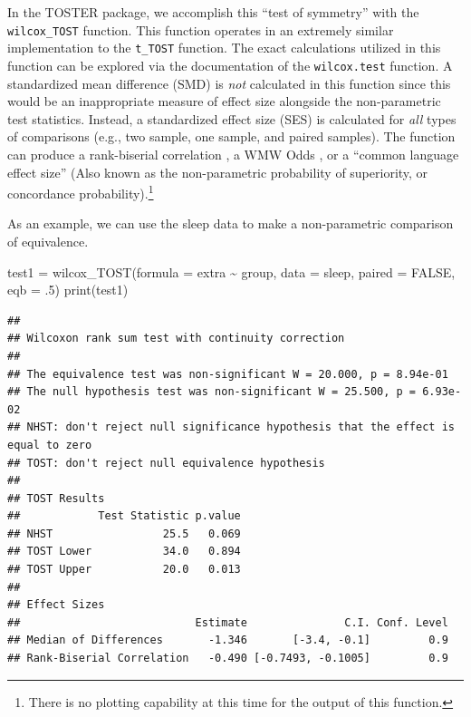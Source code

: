 \documentclass[]{interact}
\theoremstyle{plain}%
\theoremstyle{definition}
\theoremstyle{remark}
\newenvironment{Shaded}{\begin{snugshade}}{\end{snugshade}}
\newcommand{\AttributeTok}[1]{\textcolor[rgb]{0.77,0.63,0.00}{#1}}
\newcommand{\ConstantTok}[1]{\textcolor[rgb]{0.00,0.00,0.00}{#1}}
\newcommand{\DecValTok}[1]{\textcolor[rgb]{0.00,0.00,0.81}{#1}}
\newcommand{\FunctionTok}[1]{\textcolor[rgb]{0.00,0.00,0.00}{#1}}
\newcommand{\NormalTok}[1]{#1}
\newcommand{\OtherTok}[1]{\textcolor[rgb]{0.56,0.35,0.01}{#1}}
\newcommand{\SpecialCharTok}[1]{\textcolor[rgb]{0.00,0.00,0.00}{#1}}
\begin{document}
In the TOSTER package, we accomplish this ``test of symmetry'' with the
\texttt{wilcox\_TOST} function. This function operates in an extremely
similar implementation to the \texttt{t\_TOST} function. The exact
calculations utilized in this function can be explored via the
documentation of the \texttt{wilcox.test} function. A standardized mean
difference (SMD) is \emph{not} calculated in this function since this
would be an inappropriate measure of effect size alongside the
non-parametric test statistics. Instead, a standardized effect size
(SES) is calculated for \emph{all} types of comparisons (e.g., two
sample, one sample, and paired samples). The function can produce a
rank-biserial correlation \citep{Kerby_2014}, a WMW Odds
\citep{wmwodds}, or a ``common language effect size'' \citep{Kerby_2014}
(Also known as the non-parametric probability of superiority, or
concordance probability).\footnote{There is no plotting capability at
  this time for the output of this function.}

\newpage

As an example, we can use the sleep data to make a non-parametric
comparison of equivalence.

\begin{Shaded}
\begin{Highlighting}[]
\NormalTok{test1 }\OtherTok{=} \FunctionTok{wilcox\_TOST}\NormalTok{(}\AttributeTok{formula =}\NormalTok{ extra }\SpecialCharTok{\textasciitilde{}}\NormalTok{ group,}
                      \AttributeTok{data =}\NormalTok{ sleep,}
                      \AttributeTok{paired =} \ConstantTok{FALSE}\NormalTok{,}
                      \AttributeTok{eqb =}\NormalTok{ .}\DecValTok{5}\NormalTok{)}
\FunctionTok{print}\NormalTok{(test1)}
\end{Highlighting}
\end{Shaded}

\begin{verbatim}
## 
## Wilcoxon rank sum test with continuity correction
## 
## The equivalence test was non-significant W = 20.000, p = 8.94e-01
## The null hypothesis test was non-significant W = 25.500, p = 6.93e-02
## NHST: don't reject null significance hypothesis that the effect is equal to zero 
## TOST: don't reject null equivalence hypothesis
## 
## TOST Results 
##            Test Statistic p.value
## NHST                 25.5   0.069
## TOST Lower           34.0   0.894
## TOST Upper           20.0   0.013
## 
## Effect Sizes 
##                           Estimate               C.I. Conf. Level
## Median of Differences       -1.346       [-3.4, -0.1]         0.9
## Rank-Biserial Correlation   -0.490 [-0.7493, -0.1005]         0.9
\end{verbatim}
\end{document}

